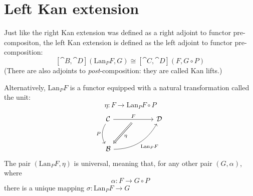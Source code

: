 \documentclass[DaoFP]{subfiles}
\begin{document}
\section{Left Kan extension}

Just like the right Kan extension was defined as a right adjoint to functor pre-compositon, the left Kan extension is defined as the left adjoint to functor pre-composition:
\[ [\cat B, \cat D](\text{Lan}_P F , G) \cong  [\cat C, \cat D] (F, G \circ P) \]
 (There are also adjoints to \emph{post}-composition: they are called Kan lifts.)

Alternatively, $\text{Lan}_P F$ is a functor equipped with a natural transformation called the unit:
\[ \eta \colon F \to \text{Lan}_P F \circ P \]
\[
 \begin{tikzcd} [row sep=1cm, column sep=1cm]
 \cat C
 \arrow[rr, "F", "" {name=ID, below} ]
 \arrow[d, bend right, "P"']
 && \cat D
 \\
 \cat B
  \arrow[urr, bend right, "\text{Lan}_P F"']
 \arrow[Rightarrow, "\eta",  from=ID]
 \end{tikzcd}
\]
The pair $(\text{Lan}_P F, \eta)$ is universal, meaning that, for any other pair $(G, \alpha)$, where 
\[ \alpha \colon F \to G \circ P\] 
there is a unique mapping $\sigma \colon \text{Lan}_P F \to G$ 
\end{document}
